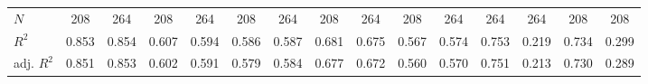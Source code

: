 \begin{table}[htbp]
\begin{tabular}{l*{14}{c}}
\hline
\(N\)       &         208         &         264         &         208         &         264         &         208         &         264         &         208         &         264         &         208         &         264         &         264         &         264         &         208         &         208         \\
\(R^{2}\)   &       0.853         &       0.854         &       0.607         &       0.594         &       0.586         &       0.587         &       0.681         &       0.675         &       0.567         &       0.574         &       0.753         &       0.219         &       0.734         &       0.299         \\
adj. \(R^{2}\)&       0.851         &       0.853         &       0.602         &       0.591         &       0.579         &       0.584         &       0.677         &       0.672         &       0.560         &       0.570         &       0.751         &       0.213         &       0.730         &       0.289         \\
\hline\hline
\end{tabular}
\end{table}
